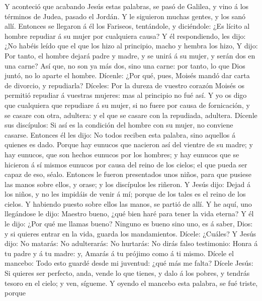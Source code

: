  Y aconteció que acabando Jesús estas palabras, se pasó de
Galilea, y vino á los términos de Judea, pasado el Jordán. 
Y le siguieron muchas gentes, y los sanó allí.  Entonces se
llegaron á él los Fariseos, tentándole, y diciéndole: ¿Es lícito al
hombre repudiar á su mujer por cualquiera causa?  Y él
respondiendo, les dijo: ¿No habéis leído que el que los hizo al
principio, macho y hembra los hizo,  Y dijo: Por tanto, el
hombre dejará padre y madre, y se unirá á su mujer, y serán dos en una
carne?  Así que, no son ya más dos, sino una carne: por
tanto, lo que Dios juntó, no lo aparte el hombre.  Dícenle:
¿Por qué, pues, Moisés mandó dar carta de divorcio, y repudiarla?
 Díceles: Por la dureza de vuestro corazón Moisés os
permitió repudiar á vuestras mujeres: mas al principio no fué así.
 Y yo os digo que cualquiera que repudiare á su mujer, si no
fuere por causa de fornicación, y se casare con otra, adultera: y el que
se casare con la repudiada, adultera.  Dícenle sus
discípulos: Si así es la condición del hombre con su mujer, no conviene
casarse.  Entonces él les dijo: No todos reciben esta
palabra, sino aquellos á quienes es dado.  Porque hay
eunucos que nacieron así del vientre de su madre; y hay eunucos, que son
hechos eunucos por los hombres; y hay eunucos que se hicieron á sí
mismos eunucos por causa del reino de los cielos; el que pueda ser capaz
de eso, séalo.  Entonces le fueron presentados unos niños,
para que pusiese las manos sobre ellos, y orase; y los discípulos les
riñeron.  Y Jesús dijo: Dejad á los niños, y no les
impidáis de venir á mí; porque de los tales es el reino de los cielos.
 Y habiendo puesto sobre ellos las manos, se partió de
allí.  Y he aquí, uno llegándose le dijo: Maestro bueno,
¿qué bien haré para tener la vida eterna?  Y él le dijo:
¿Por qué me llamas bueno? Ninguno es bueno sino uno, es á saber, Dios: y
si quieres entrar en la vida, guarda los mandamientos. 
Dícele: ¿Cuáles? Y Jesús dijo: No matarás: No adulterarás: No hurtarás:
No dirás falso testimonio:  Honra á tu padre y á tu madre:
y, Amarás á tu prójimo como á ti mismo.  Dícele el mancebo:
Todo esto guardé desde mi juventud: ¿qué más me falta? 
Dícele Jesús: Si quieres ser perfecto, anda, vende lo que tienes, y dalo
á los pobres, y tendrás tesoro en el cielo; y ven, sígueme.
 Y oyendo el mancebo esta palabra, se fué triste, porque
